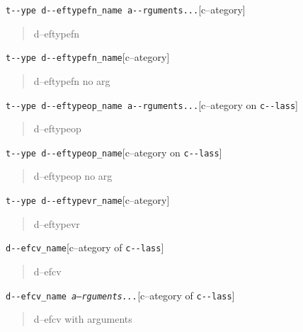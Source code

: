 \documentclass{book}
\begin{document}
\begin{titlepage}
\noindent\texttt{t{-}{-}ype d{-}{-}eftypefn\_name a{-}{-}rguments...}\hfill[c--ategory]

%
\begin{quote}
\unskip{\parskip=0pt\noindent}%
d--eftypefn
\end{quote}

\noindent\texttt{t{-}{-}ype d{-}{-}eftypefn\_name}\hfill[c--ategory]

%
\begin{quote}
\unskip{\parskip=0pt\noindent}%
d--eftypefn no arg
\end{quote}

\noindent\texttt{t{-}{-}ype d{-}{-}eftypeop\_name a{-}{-}rguments...}\hfill[c--ategory on \texttt{c{-}{-}lass}]

%
\begin{quote}
\unskip{\parskip=0pt\noindent}%
d--eftypeop
\end{quote}

\noindent\texttt{t{-}{-}ype d{-}{-}eftypeop\_name}\hfill[c--ategory on \texttt{c{-}{-}lass}]

%
\begin{quote}
\unskip{\parskip=0pt\noindent}%
d--eftypeop no arg
\end{quote}

\noindent\texttt{t{-}{-}ype d{-}{-}eftypevr\_name}\hfill[c--ategory]

%
\begin{quote}
\unskip{\parskip=0pt\noindent}%
d--eftypevr
\end{quote}

\noindent\texttt{d{-}{-}efcv\_name}\hfill[c--ategory of \texttt{c{-}{-}lass}]

%
\begin{quote}
\unskip{\parskip=0pt\noindent}%
d--efcv
\end{quote}

\noindent\texttt{d{-}{-}efcv\_name \EmbracOn{}\textnormal{\textsl{a--rguments...}}\EmbracOff{}}\hfill[c--ategory of \texttt{c{-}{-}lass}]

%
\begin{quote}
\unskip{\parskip=0pt\noindent}%
d--efcv with arguments
\end{quote}


\end{titlepage}
\end{document}
